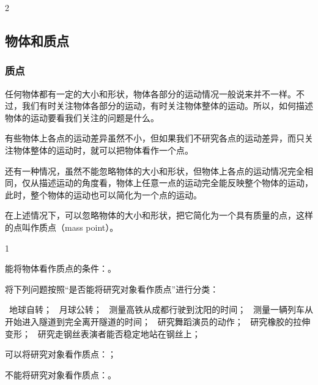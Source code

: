 \begin{paracol}{2}
	\NoteArea[0.6cm]

	\subsection{物体和质点}
	
	
	\subsubsection{质点}
	任何物体都有一定的大小和形状，物体各部分的运动情况一般说来并不一样。不过，我们有时关注物体各部分的运动，有时关注物体整体的运动。所以，如何描述物体的运动要看我们关注的问题是什么。
	
	有些物体上各点的运动差异虽然不小，但如果我们{\ep 不研究各点的运动差异，而只关注物体整体的运动时}，就可以把物体看作一个点。
	
	还有一种情况，虽然不能忽略物体的大小和形状，但{\ep 物体上各点的运动情况完全相同，仅从描述运动的角度看，物体上任意一点的运动完全能反映整个物体的运动}，此时，整个物体的运动也可以简化为一个点的运动。
	
	在上述情况下，可以{\ep 忽略物体的大小和形状}，把它简化为一个{\ep 具有质量的点}，这样的点叫作{\ep 质点}（mass point）。


\end{paracol}

\begin{Check}
	\begin{NumberedItem}{1}
		\item 能将物体看作质点的条件：\underline{\hspace*{7.0cm}}。
		
		\item 将下列问题按照“是否能将研究对象看作质点”进行分类：
		
		\hspace*{1.5em}
		\begin{minipage}[t]{\linewidth-1.5em}
			\cirone~地球自转；
			\cirtwo~月球公转；
			\cirthree~测量高铁从成都行驶到沈阳的时间；
			\cirfour~测量一辆列车从开始进入隧道到完全离开隧道的时间；
			\cirfive~研究舞蹈演员的动作；
			\cirsix~研究橡胶的拉伸变形；
			\cirseven~研究走钢丝表演者能否稳定地站在钢丝上；
			
			可以将研究对象看作质点：\underline{\hspace*{7.0cm}}；
			
			不能将研究对象看作质点：\underline{\hspace*{7.0cm}}。
		\end{minipage}
		
	
	\end{NumberedItem}
\end{Check}



